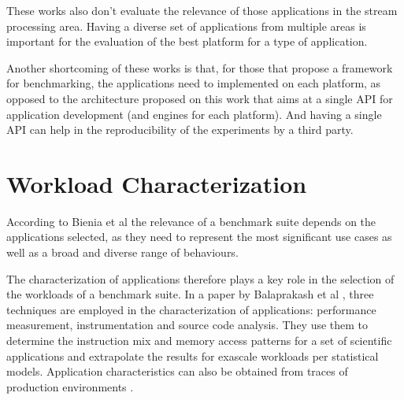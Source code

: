 \documentclass[ppgc,diss,english]{iiufrgs}
\begin{document}
These works also don't evaluate the relevance of those applications in the stream processing area. Having a diverse set of applications from multiple areas is important for the evaluation of the best platform for a type of application.

Another shortcoming of these works is that, for those that propose a framework for benchmarking, the applications need to implemented on each platform, as opposed to the architecture proposed on this work that aims at a single API for application development (and engines for each platform). And having a single API can help in the reproducibility of the experiments by a third party.

\section{Workload Characterization}
\label{sec:esp:workload_characterization}

According to Bienia et al \cite{bienia2008parsec} the relevance of a benchmark suite depends on the applications selected, as they need to represent the most significant use cases as well as a broad and diverse range of behaviours.

The characterization of applications therefore plays a key role in the selection of the workloads of a benchmark suite. In a paper by Balaprakash et al \cite{balaprakash2013exascale}, three techniques are employed in the characterization of applications: performance measurement, instrumentation and source code analysis. They use them to determine the instruction mix and memory access patterns for a set of scientific applications and extrapolate the results for exascale workloads per statistical models. Application characteristics can also be obtained from traces of production environments \cite{khan2012workload}.


\end{document}
